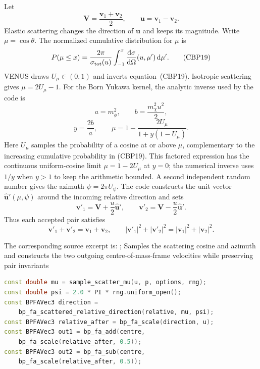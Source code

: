 Let
\[
 \boldsymbol V=\frac{\boldsymbol v_1+\boldsymbol v_2}{2},
 \qquad \boldsymbol u=\boldsymbol v_1-\boldsymbol v_2. \tag{CBP18}
\]
Elastic scattering changes the direction of \(\boldsymbol u\) and keeps its
magnitude.  Write \(\mu=\cos\theta\).  The normalized cumulative distribution
for \(\mu\) is
\[
 P(\mu\le x)=
 \frac{2\pi}{\sigma_{\rm tot}(u)}
 \int_{-1}^{x}\frac{\mathrm d\sigma}{\mathrm d\Omega}(u,\mu')\,\mathrm d\mu'. \tag{CBP19}
\]
VENUS draws \(U_\mu\in(0,1)\) and inverts equation~(CBP19).  Isotropic
scattering gives \(\mu=2U_\mu-1\).  For the Born Yukawa kernel, the analytic
inverse used by the code is
\[
 a=m_\phi^2,\qquad b=\frac{m_\chi^2u^2}{2},
\]
\[
 y=\frac{2b}{a},\qquad
 \mu=1-\frac{2U_\mu}{1+y(1-U_\mu)}.                     \tag{CBP20}
\]
Here \(U_\mu\) samples the probability of a cosine at or above \(\mu\),
complementary to the increasing cumulative probability in (CBP19).
This factored expression has the continuous uniform-cosine limit
\(\mu=1-2U_\mu\) at \(y=0\); the numerical inverse uses \(1/y\) when
\(y>1\) to keep the arithmetic bounded.
A second independent random number gives the azimuth
\(\psi=2\pi U_\psi\).  The code constructs the unit vector
\(\widehat{\boldsymbol u}'(\mu,\psi)\) around the incoming relative direction
and sets
\[
 \boldsymbol v'_1=\boldsymbol V+\frac{u}{2}
       \widehat{\boldsymbol u}',\qquad
 \boldsymbol v'_2=\boldsymbol V-\frac{u}{2}
       \widehat{\boldsymbol u}'.                        \tag{CBP21}
\]
Thus each accepted pair satisfies
\[
 \boldsymbol v'_1+\boldsymbol v'_2=\boldsymbol v_1+\boldsymbol v_2,
 \qquad
 |\boldsymbol v'_1|^2+|\boldsymbol v'_2|^2
 =|\boldsymbol v_1|^2+|\boldsymbol v_2|^2.              \tag{CBP22}
\]

The corresponding source excerpt is:
{;
 }
{Samples the scattering cosine and azimuth and constructs the two outgoing
 centre-of-mass-frame velocities while preserving pair invariants}
\begin{lstlisting}[language=C++]
const double mu = sample_scatter_mu(u, p, options, rng);
const double psi = 2.0 * PI * rng.uniform_open();
const BPFAVec3 direction =
    bp_fa_scattered_relative_direction(relative, mu, psi);
const BPFAVec3 relative_after = bp_fa_scale(direction, u);
const BPFAVec3 out1 = bp_fa_add(centre,
    bp_fa_scale(relative_after, 0.5));
const BPFAVec3 out2 = bp_fa_sub(centre,
    bp_fa_scale(relative_after, 0.5));
\end{lstlisting}


